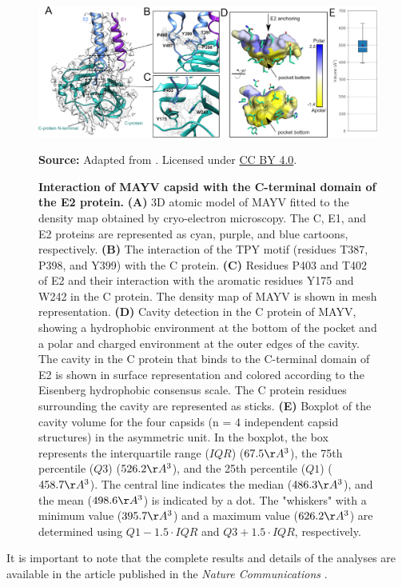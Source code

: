 \documentclass[Ingles]{phdthesis}
\begin{document}
\begin{figure}[hp]
  \centerline{\includegraphics[scale=1.5]{images/mayv-c-e2.png}}
  \centerline{\tiny{\textbf{Source:} Adapted from \cite{ribeiro2021}. Licensed under \href{https://creativecommons.org/licenses/by/4.0/}{CC BY 4.0}.}}
  \caption[Interaction of MAYV capsid with the C-terminal domain of the E2 protein]{\textbf{Interaction of MAYV capsid with the C-terminal domain of the E2 protein.} \textbf{(A)} 3D atomic model of \acs{MAYV} fitted to the density map obtained by cryo-electron microscopy. The C, E1, and E2 proteins are represented as cyan, purple, and blue cartoons, respectively. \textbf{(B)} The interaction of the TPY motif (residues T387, P398, and Y399) with the C protein. \textbf{(C)} Residues P403 and T402 of E2 and their interaction with the aromatic residues Y175 and W242 in the C protein. The density map of \acs{MAYV} is shown in mesh representation. \textbf{(D)} Cavity detection in the C protein of \acs{MAYV}, showing a hydrophobic environment at the bottom of the pocket and a polar and charged environment at the outer edges of the cavity. The cavity in the C protein that binds to the C-terminal domain of E2 is shown in surface representation and colored according to the Eisenberg hydrophobic consensus scale. The C protein residues surrounding the cavity are represented as sticks. \textbf{(E)} Boxplot of the cavity volume for the four capsids (n = 4 independent capsid structures) in the asymmetric unit. In the boxplot, the box represents the interquartile range ($IQR$) ($67.5 \AA^3$), the 75th percentile ($Q3$) ($526.2 \AA^3$), and the 25th percentile ($Q1$) ($458.7 \AA^3$). The central line indicates the median ($486.3 \AA^3$), and the mean ($498.6 \AA^3$) is indicated by a dot. The "whiskers" with a minimum value ($395.7 \AA^3$) and a maximum value ($626.2 \AA^3$) are determined using $Q1-1.5 \cdot IQR$ and $Q3+1.5 \cdot IQR$, respectively.}
  \label{fig:mayv-c-e2}
\end{figure}

It is important to note that the complete results and details of the analyses are available in the article published in the \textit{Nature Communications} \cite{ribeiro2021}.
\end{document}
